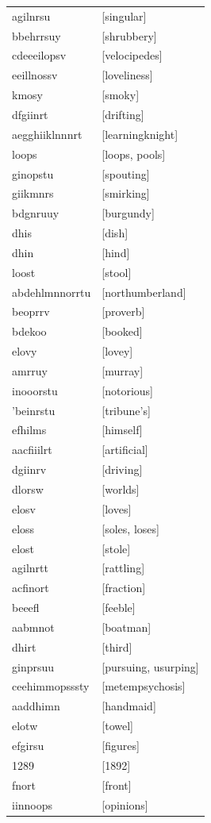 \documentclass{article}
\begin{document}
\begin{tabular}{ll}
agilnrsu & [singular] \\
bbehrrsuy & [shrubbery] \\
cdeeeilopsv & [velocipedes] \\
eeillnossv & [loveliness] \\
kmosy & [smoky] \\
dfgiinrt & [drifting] \\
aegghiiklnnnrt & [learningknight] \\
loops & [loops, pools] \\
ginopstu & [spouting] \\
giikmnrs & [smirking] \\
bdgnruuy & [burgundy] \\
dhis & [dish] \\
dhin & [hind] \\
loost & [stool] \\
abdehlmnnorrtu & [northumberland] \\
beoprrv & [proverb] \\
bdekoo & [booked] \\
elovy & [lovey] \\
amrruy & [murray] \\
inooorstu & [notorious] \\
'beinrstu & [tribune's] \\
efhilms & [himself] \\
aacfiiilrt & [artificial] \\
dgiinrv & [driving] \\
dlorsw & [worlds] \\
elosv & [loves] \\
eloss & [soles, loses] \\
elost & [stole] \\
agilnrtt & [rattling] \\
acfinort & [fraction] \\
beeefl & [feeble] \\
aabmnot & [boatman] \\
dhirt & [third] \\
ginprsuu & [pursuing, usurping] \\
ceehimmopsssty & [metempsychosis] \\
aaddhimn & [handmaid] \\
elotw & [towel] \\
efgirsu & [figures] \\
1289 & [1892] \\
fnort & [front] \\
iinnoops & [opinions] \\

\end{tabular}
\end{document}
